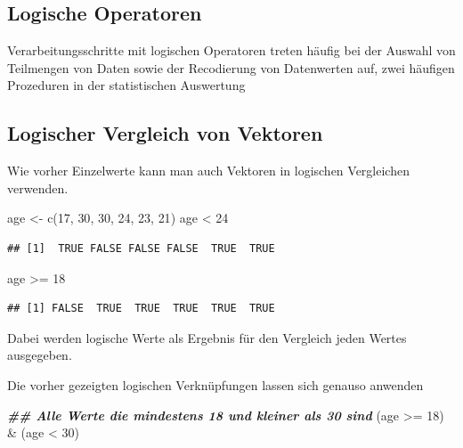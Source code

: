 \documentclass[
]{book}
\newenvironment{Shaded}{\begin{snugshade}}{\end{snugshade}}
\newcommand{\DecValTok}[1]{\textcolor[rgb]{0.00,0.00,0.81}{#1}}
\newcommand{\DocumentationTok}[1]{\textcolor[rgb]{0.56,0.35,0.01}{\textbf{\textit{#1}}}}
\newcommand{\FunctionTok}[1]{\textcolor[rgb]{0.00,0.00,0.00}{#1}}
\newcommand{\NormalTok}[1]{#1}
\newcommand{\OtherTok}[1]{\textcolor[rgb]{0.56,0.35,0.01}{#1}}
\newcommand{\SpecialCharTok}[1]{\textcolor[rgb]{0.00,0.00,0.00}{#1}}
\begin{document}
\hypertarget{logische-operatoren}{%
\subsection{Logische Operatoren}\label{logische-operatoren}}

Verarbeitungsschritte mit logischen Operatoren treten häufig bei der Auswahl von Teilmengen von Daten
sowie der Recodierung von Datenwerten auf, zwei häufigen Prozeduren in der statistischen Auswertung

\hypertarget{logischer-vergleich-von-vektoren}{%
\subsection{Logischer Vergleich von Vektoren}\label{logischer-vergleich-von-vektoren}}

Wie vorher Einzelwerte kann man auch Vektoren in logischen Vergleichen verwenden.

\begin{Shaded}
\begin{Highlighting}[]
\NormalTok{age }\OtherTok{\textless{}{-}} \FunctionTok{c}\NormalTok{(}\DecValTok{17}\NormalTok{, }\DecValTok{30}\NormalTok{, }\DecValTok{30}\NormalTok{, }\DecValTok{24}\NormalTok{, }\DecValTok{23}\NormalTok{, }\DecValTok{21}\NormalTok{)}
\NormalTok{age }\SpecialCharTok{\textless{}} \DecValTok{24}
\end{Highlighting}
\end{Shaded}

\begin{verbatim}
## [1]  TRUE FALSE FALSE FALSE  TRUE  TRUE
\end{verbatim}

\begin{Shaded}
\begin{Highlighting}[]
\NormalTok{age }\SpecialCharTok{\textgreater{}=} \DecValTok{18}
\end{Highlighting}
\end{Shaded}

\begin{verbatim}
## [1] FALSE  TRUE  TRUE  TRUE  TRUE  TRUE
\end{verbatim}

Dabei werden logische Werte als Ergebnis für den Vergleich jeden Wertes ausgegeben.

Die vorher gezeigten logischen Verknüpfungen lassen sich genauso anwenden

\begin{Shaded}
\begin{Highlighting}[]
 \DocumentationTok{\#\# Alle Werte die mindestens 18 und kleiner als 30 sind}
\NormalTok{(age }\SpecialCharTok{\textgreater{}=} \DecValTok{18}\NormalTok{) }\SpecialCharTok{\&}\NormalTok{ (age }\SpecialCharTok{\textless{}} \DecValTok{30}\NormalTok{)}
\end{Highlighting}
\end{Shaded}
\end{document}
